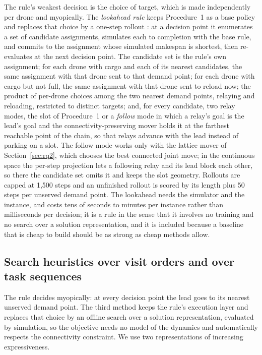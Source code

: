 \documentclass[final,5p,times,twocolumn]{elsarticle}
\begin{document}
The rule's weakest decision is the choice of target, which is made independently per drone and
myopically. The \emph{lookahead rule} keeps Procedure~1 as a base policy and replaces that choice by a
one-step rollout \cite{bertsekas1997rollout}: at a decision point it enumerates a set of candidate
assignments, simulates each to completion with the base rule, and commits to the assignment whose
simulated makespan is shortest, then re-evaluates at the next decision point. The candidate set is
the rule's own assignment; for each drone with cargo and each of its nearest candidates, the same
assignment with that drone sent to that demand point; for each drone with cargo but not full,
the same assignment with that drone sent to reload now; the product of per-drone choices among
the two nearest demand points, relaying and reloading, restricted to distinct targets; and, for every
candidate, two relay modes, the slot of Procedure~1 or a \emph{follow} mode in which a relay's goal is the
lead's goal and the connectivity-preserving mover holds it at the farthest reachable point of the
chain, so that relays advance with the lead instead of parking on a slot. The follow mode works
only with the lattice mover of Section~\ref{sec:rq2}, which chooses the best connected joint move;
in the continuous space the per-step projection lets a following relay and its lead block each other, so
there the candidate set omits it and keeps the slot geometry. Rollouts are capped at 1{,}500 steps
and an unfinished rollout is scored by its length plus 50 steps per unserved demand point. The
lookahead needs the simulator and the instance, and costs tens of seconds to minutes per instance
rather than milliseconds per decision; it is a rule in the sense that it involves no training and no
search over a solution representation, and it is included because a baseline that is cheap to
build should be as strong as cheap methods allow.

\subsection{Search heuristics over visit orders and over task sequences}
\label{sec:search}

The rule decides myopically: at every decision point the lead goes to its nearest unserved demand
point. The third method keeps the rule's execution layer and replaces that choice by an offline
search over a solution representation, evaluated by simulation, so the objective needs no model
of the dynamics and automatically respects the connectivity constraint. We use two
representations of increasing expressiveness.
\end{document}

